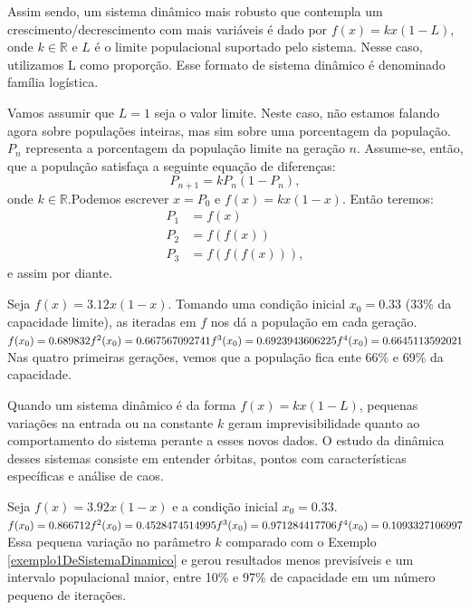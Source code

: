 \documentclass[../IC.tex]{subfiles}
\begin{document}
	Assim sendo, um sistema dinâmico mais robusto que contempla um crescimento/decrescimento com mais variáveis é dado por $f(x) = kx(1 - L)$, onde $k \in \mathbb{R}$ e $L$ é o limite populacional suportado pelo sistema. Nesse caso, utilizamos L como proporção. Esse formato de sistema dinâmico é denominado família logística.
	
	\begin{exemplo}
		Vamos assumir que $L = 1$ seja o valor limite. Neste caso, não estamos falando agora sobre populações inteiras, mas sim sobre uma porcentagem da população. $P_n$ representa a porcentagem da população limite na geração $n$. Assume-se, então, que a população satisfaça a seguinte equação de diferenças:
		$$P_{n+1} = kP_n(1 - P_n),$$
		onde $k \in \mathbb{R}$.Podemos escrever $x = P_0$ e $f(x) = kx(1 - x)$. Então teremos:
		\begin{align*}
			P_1 &= f(x) \\
			P_2 &= f(f(x)) \\
			P_3 &= f(f(f(x))),
		\end{align*}
		e assim por diante.
	\end{exemplo}
	
	\begin{exemplo}\label{exemplo1DeSistemaDinamico}
		Seja $f(x) = 3.12x(1 - x)$. Tomando uma condição inicial $x_0 = 0.33$ (33\% da capacidade limite), as iteradas em $f$ nos dá a população em cada geração.
		$\\f(x_0) = 0.689832 \\f^2(x_0) = 0.667567092741 \\f^3(x_0) = 0.6923943606225 \\f^4(x_0) = 0.6645113592021$\\
		Nas quatro primeiras gerações, vemos que a população fica ente 66\% e 69\% da capacidade.
	\end{exemplo}
	
	Quando um sistema dinâmico é da forma $f(x) = kx(1 - L)$, pequenas variações na entrada ou na constante $k$ geram imprevisibilidade quanto ao comportamento do sistema perante a esses novos dados. O estudo da dinâmica desses sistemas consiste em entender órbitas, pontos com características específicas e análise de caos.
	
	\begin{exemplo}
		Seja $f(x) = 3.92x(1 - x)$ e a condição inicial $x_0 = 0.33$.
		$\\f(x_0) = 0.866712 \\f^2(x_0) = 0.4528474514995 \\f^3(x_0) = 0.971284417706 \\f^4(x_0) = 0.1093327106997$\\
		Essa pequena variação no parâmetro $k$ comparado com o Exemplo \ref{exemplo1DeSistemaDinamico} e gerou resultados menos previsíveis e um intervalo populacional maior, entre 10\% e 97\% de capacidade em um número pequeno de iterações.
	\end{exemplo}
\end{document}
